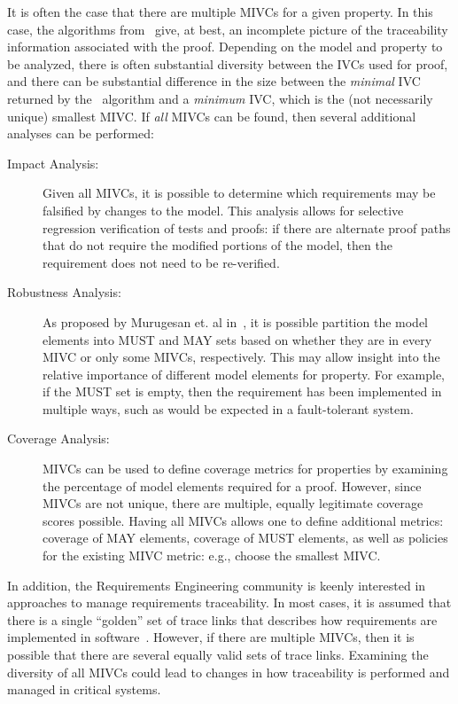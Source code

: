 It is often the case that there are multiple MIVCs for a given property.  In this case, the algorithms from~\cite{Ghass16} give, at best, an incomplete picture of the traceability information associated with the proof.  Depending on the model and property to be analyzed, there is often substantial diversity between the IVCs used for proof, and there can be substantial difference in the size between the {\em minimal} IVC returned by the \ucbfalg\ algorithm and a {\em minimum} IVC, which is the (not necessarily unique) smallest MIVC.
 If {\em all} MIVCs can be found, then several additional analyses can be performed:
\begin{description}
    \item[Impact Analysis:] Given all MIVCs, it is possible to determine which requirements may be falsified by changes to the model.  This analysis allows for selective regression verification of tests and proofs: if there are alternate proof paths that do not require the modified portions of the model, then the requirement does not need to be re-verified.
    \item[Robustness Analysis:] As proposed by Murugesan et. al in~\cite{Murugesan16:renext}, it is possible partition the model elements into MUST and MAY sets based on whether they are in every MIVC or only some MIVCs, respectively.  This may allow insight into the relative importance of different model elements for property.  For example, if the MUST set is empty, then the requirement has been implemented in multiple ways, such as would be expected in a fault-tolerant system.
    \item[Coverage Analysis:] MIVCs can be used to define coverage metrics for properties by examining the percentage of model elements required for a proof.  However, since MIVCs are not unique, there are multiple, equally legitimate coverage scores possible.  Having all MIVCs allows one to define additional metrics: coverage of MAY elements, coverage of MUST elements, as well as policies for the existing MIVC metric: e.g., choose the smallest MIVC. %
\end{description}

\noindent In addition, the Requirements Engineering community is keenly interested in approaches to manage requirements traceability.  In most cases, it is assumed that there is a single ``golden'' set of trace links that describes how requirements are implemented in software~\cite{COEST,hayes2003improving,cleland2007best}.  However, if there are multiple MIVCs, then it is possible that there are several equally valid sets of trace links.  Examining the diversity of all MIVCs could lead to changes in how traceability is performed and managed in critical systems.

